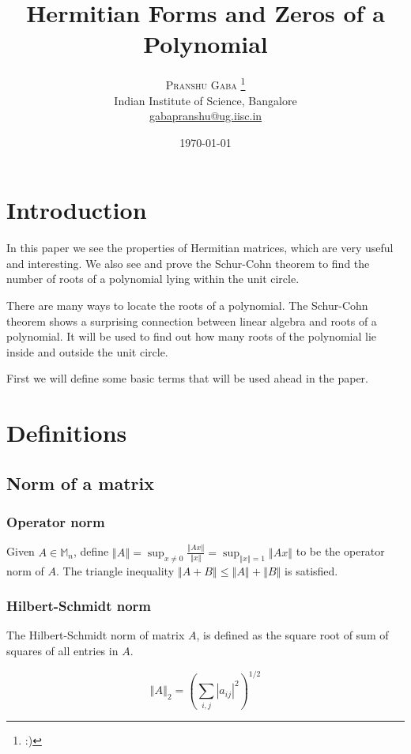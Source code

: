 \documentclass[twofold]{article}
\author{%
\textsc{Pranshu Gaba} \thanks{:)} \\[1ex]
\normalsize Indian Institute of Science, Bangalore \\
\normalsize \href{mailto:gabapranshu@iisc.ac.in}{gabapranshu@ug.iisc.in}}
\title{Hermitian Forms and Zeros of a Polynomial}
\date{\today}
\newcommand*\norm[1]{\left \Vert #1 \right\Vert}
\newcommand*\abs[1]{\left \vert #1 \right\vert}
\theoremstyle{plain}
\theoremstyle{definition}
\begin{document}
\maketitle

\section{Introduction}


In this paper we see the properties of Hermitian matrices, which are very useful and interesting. We also see and prove the Schur-Cohn theorem to find the number of roots of a polynomial lying within the unit circle. 

There are many ways to locate the roots of a polynomial. The Schur-Cohn theorem shows a surprising connection between linear algebra and roots of a polynomial. It will be used to find out how many roots of the polynomial lie inside and outside the unit circle.

First we will define some basic terms that will be used ahead in the paper.

\section{Definitions}



\subsection{Norm of a matrix}

\subsubsection{Operator norm}
Given \(A \in \mathbb{M}_n\), define \(\norm{A} =\displaystyle \sup _{x \neq 0} \frac{\norm{Ax}}{\norm{x}} = \sup_{\norm{x} = 1} \norm{Ax} \) to be the operator norm of \(A\). The triangle inequality \(\norm{A + B} \leq \norm{A} + \norm{B}\) is satisfied. 

\subsubsection{Hilbert-Schmidt norm}

The Hilbert-Schmidt norm of matrix \(A\), is defined as the square root of sum of squares of all entries in \(A\). 

 \[\norm{A}_2 = \left( \sum_{i, j} \abs{a_{ij}}^2 \right) ^{1/2}\]
\end{document}
